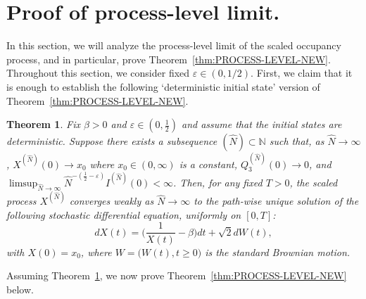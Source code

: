 \documentclass[11pt, reqno]{article}
\newtheorem{theorem}{Theorem}
\numberwithin{equation}{section}
\numberwithin{theorem}{section}
\newcommand\blue[1]{#1}
\begin{document}
\section{Proof of process-level limit.}
\label{sec:PROCESS-LEVEL}
In this section, we will analyze the process-level limit of the scaled occupancy process, and in particular, prove Theorem~\ref{thm:PROCESS-LEVEL-NEW}. \blue{Throughout this section, we consider fixed $\varepsilon \in (0, 1/2)$.
First, we claim that it is enough to establish the following `deterministic initial state' version of 
Theorem~\ref{thm:PROCESS-LEVEL-NEW}.}
\begin{theorem}\label{thm:PROCESS-LEVEL}
Fix $\beta>0$ and $\varepsilon \in (0, \frac{1}{2})$ \blue{ and assume that the initial states are deterministic. Suppose there exists a subsequence $(\hat{N}) \subset \mathbb{N}$
such that, as $\hat{N}\rightarrow\infty$, $X^{(\hat{N})}(0)\to x_0$  where $x_0\in (0,\infty)$ is a constant, 
$Q_3^{(\hat{N})}(0)\to 0$, and 
$\limsup_{\hat{N}\rightarrow\infty} \hat{N}^{-(\frac{1}{2}-\varepsilon)}I^{(\hat{N})}(0)<\infty$.}
Then, for any fixed $T>0$, the scaled process $X^{(\hat{N})}$ converges weakly as $\hat{N} \rightarrow \infty$ to the path-wise unique solution of the following stochastic differential equation, uniformly on $[0,T]$:
\begin{equation}%
    dX(t)=\Big(\frac{1}{X(t)}-\beta\Big)dt+\sqrt{2}dW(t),
\end{equation}
with $X(0)= x_0$,
where $W=\big(W(t),t\geq 0\big)$ is the standard Brownian motion.
\end{theorem}
Assuming Theorem~\ref{thm:PROCESS-LEVEL}, we now prove Theorem~\ref{thm:PROCESS-LEVEL-NEW} below.
\end{document}
